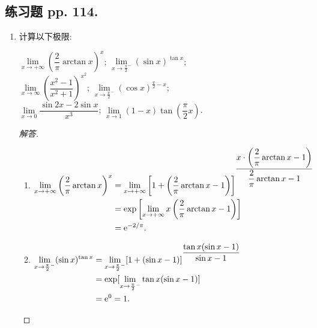 \documentclass[a4paper,11pt,twoside]{ctexbook}
\newcommand{\e}{\mathrm e}
\begin{document}
\subsection{练习题 pp. 114.}
\begin{enumerate}
	\item 计算以下极限:
	      \begin{tabenum}[(1)]
		      \tabenumitem $\lim\limits_{x\to+\infty} \left(\dfrac{2}{\pi}\arctan{x}\right)^x$;
		      \tabenumitem $\lim\limits_{x\to\frac{\pi}{2}^{-}} (\sin{x})^{\tan{x}}$;\\
		      \tabenumitem $\lim\limits_{x\to\infty} \left(\dfrac{x^2-1}{x^2+1}\right)^{x^2}$;
		      \tabenumitem $\lim\limits_{x\to\frac{\pi}{2}^{-}} (\cos{x})^{\frac{\pi}{2}-x}$;\\
		      \tabenumitem $\lim\limits_{x\to 0} \dfrac{\sin{2x}-2\sin{x}}{x^3}$;
		      \tabenumitem $\lim\limits_{x\to 1} (1-x)\tan\left(\dfrac{\pi}{2}x\right)$.
	      \end{tabenum}

	      \begin{proof}[解答]
		      \begin{enumerate}[(1)]
			      \item $\begin{aligned}[t]
					            \lim\limits_{x\to+\infty} \left(\dfrac{2}{\pi}\arctan{x}\right)^x & =  \lim\limits_{x\to+\infty} \left[1+\left(\dfrac{2}{\pi}\arctan{x}-1\right)\right]^{\dfrac{x\cdot\left(\dfrac{2}{\pi}\arctan{x}-1\right)}{\dfrac{2}{\pi}\arctan{x}-1}} \\
					                                                                              & =                                                                   {\rm exp}\left[\lim\limits_{x\to+\infty} x\left(\dfrac{2}{\pi}\arctan{x}-1\right)\right]           \\
					                                                                              & =                                                                   \e^{-2/\pi}.
				            \end{aligned}$

			      \item $\begin{aligned}[t]
					            \lim\limits_{x\to\frac{\pi}{2}^{-}} (\sin{x})^{\tan{x}} & =\lim\limits_{x\to\frac{\pi}{2}^{-}} [1+(\sin{x}-1)]^{\dfrac{\tan{x}(\sin{x}-1)}{\sin{x}-1}} \\
					                                                                    & = {\rm exp}[\lim\limits_{x\to\frac{\pi}{2}^{-}} \tan{x}(\sin{x}-1)]                          \\
					                                                                    & = \e^0=1.
				            \end{aligned}$


\end{enumerate}
\end{proof}
\end{enumerate}
\end{document}
